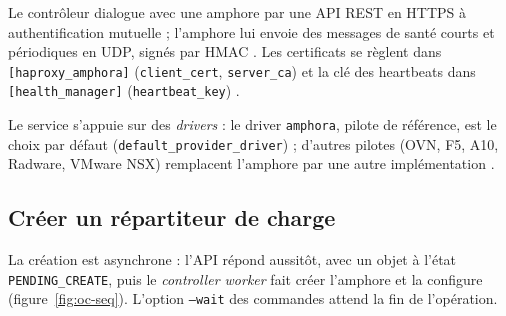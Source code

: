 Le contrôleur dialogue avec une amphore par une API REST en HTTPS à authentification mutuelle ; l'amphore lui envoie des
messages de santé courts et périodiques en UDP, signés par HMAC \parencite{octavia-components}. Les certificats se règlent
dans \texttt{[haproxy\_\allowbreak amphora]} (\texttt{client\_\allowbreak cert}, \texttt{server\_\allowbreak ca}) et la clé des heartbeats dans
\texttt{[health\_\allowbreak manager]} (\texttt{heartbeat\_\allowbreak key}) \parencite{octavia-config}.

Le service s'appuie sur des \emph{drivers} : le driver \texttt{amphora}, pilote de référence, est le choix par défaut
(\texttt{default\_\allowbreak provider\_\allowbreak driver}) ; d'autres pilotes (OVN, F5, A10, Radware, VMware NSX) remplacent l'amphore par
une autre implémentation \parencite{octavia-providers, octavia-config}.

\subsection{Créer un répartiteur de charge}\label{sec:oc-creation}

La création est asynchrone : l'API répond aussitôt, avec un objet à l'état \texttt{PENDING\_\allowbreak CREATE}, puis le
\emph{controller worker} fait créer l'amphore et la configure (figure~\ref{fig:oc-seq}). L'option \texttt{--wait} des
commandes attend la fin de l'opération.

